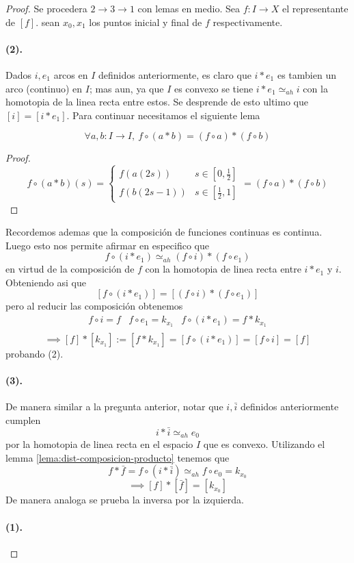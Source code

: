 \begin{proof}
Se procedera \(2 \to 3 \to 1\) con lemas en medio. Sea \(f : I \to X\) el
representante de \([f]\). sean \(x_0, x_1\) los puntos inicial y final de
\(f\) respectivamente.

\paragraph{(2).} Dados \(i,e_1\) arcos en \(I\) definidos anteriormente,
es claro que \(i * e_1\) es tambien un arco (continuo) en \(I\); mas aun,
ya que \(I\) es convexo se tiene \(i * e_1 \simeq_{ah} i\) con la
homotopia de la linea recta entre estos. Se desprende de esto ultimo que
\( [i] = [i * e_1]\). Para continuar necesitamos el siguiente lema
\begin{lema}
\label{lema:dist-composicion-producto}
\[\forall a,b : I \to I,\ f \circ (a * b) = (f \circ a) * (f \circ b) \]
\end{lema}
\begin{proof}
  \[ f \circ (a*b) (s) =
    \begin{cases}
      f (a(2s)) & s \in [0,\frac{1}{2}] \\
      f (b(2s - 1)) & s \in [\frac{1}{2} , 1]
    \end{cases}
    = (f \circ a) * (f \circ b)
  \]
\end{proof}
Recordemos ademas que la composición de funciones continuas es continua.
Luego esto nos permite afirmar en especifico que
\[ f \circ (i * e_1) \simeq_{ah} (f \circ i) * (f \circ e_1) \] en virtud
de la composición de \(f\) con la homotopia de linea recta entre \(i *
e_1 \) y \(i\). Obteniendo asi que
\[ [f \circ (i * e_1)] = [(f \circ i) * (f \circ e_1)] \] pero al reducir
las composición obtenemos
\[
  \begin{matrix}
    f \circ i = f & f \circ e_1 = k_{x_1} & f \circ (i * e_1) = f *
    k_{x_{1}} \\
  \end{matrix}
\]
\[ \implies [f] * [k_{x_1}] := [f * k_{x_1}] = [f \circ (i * e_1)] = [ f
  \circ i] = [f] \]
probando (2).

\paragraph{(3).} De manera similar a la pregunta anterior, notar que \(i,
\bar{i}\) definidos anteriormente cumplen
\[ i * \bar{i} \simeq_{ah} e_0 \]
por la homotopia de linea recta en el espacio \(I\) que es convexo.
Utilizando el lemma \eqref{lema:dist-composicion-producto} tenemos que
\[ f * \bar{f} = f \circ (i * \bar{i}) \simeq_{ah} f \circ e_0 =
  k_{x_0} \]
\[ \implies [f] * [\bar{f}] = [k_{x_0}] \]
De manera analoga se prueba la inversa por la izquierda.

\paragraph{(1).}
\end{proof}
